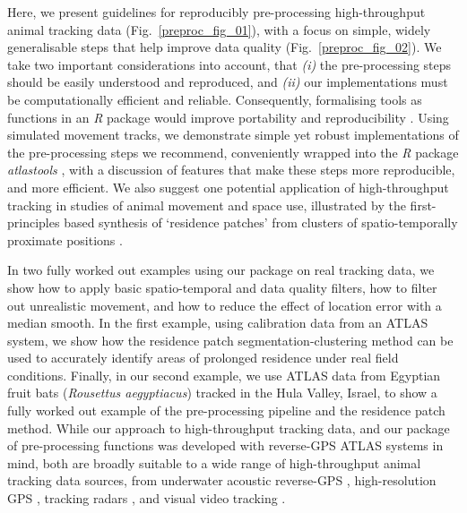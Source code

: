     Here, we present guidelines for reproducibly pre-processing high-throughput animal tracking data (Fig.~\ref{preproc_fig_01}), with a focus on simple, widely generalisable steps that help improve data quality (Fig.~\ref{preproc_fig_02}).
    We take two important considerations into account, that \textit{(i)} the pre-processing steps should be easily understood and reproduced, and \textit{(ii)} our implementations must be computationally efficient and reliable.
    Consequently, formalising tools as functions in an \textit{R} package would improve portability and reproducibility \citep{marwick2018, wickham2015}.
    Using simulated movement tracks, we demonstrate simple yet robust implementations of the pre-processing steps we recommend, conveniently wrapped into the \textit{R} package \textit{atlastools} \citep{gupte2020a}, with a discussion of features that make these steps more reproducible, and more efficient.
    We also suggest one potential application of high-throughput tracking in studies of animal movement and space use, illustrated by the first-principles based synthesis of `residence patches' from clusters of spatio-temporally proximate positions \citep[\textit{sensu}][]{bijleveld2016, oudman2018, barraquand2008}.

    In two fully worked out examples using our package on real tracking data, we show how to apply basic spatio-temporal and data quality filters, how to filter out unrealistic movement, and how to reduce the effect of location error with a median smooth.
    In the first example, using calibration data from an ATLAS system, we show how the residence patch segmentation-clustering method can be used to accurately identify areas of prolonged residence under real field conditions.
    Finally, in our second example, we use ATLAS data from Egyptian fruit bats (\textit{Rousettus aegyptiacus}) tracked in the Hula Valley, Israel, to show a fully worked out example of the pre-processing pipeline and the residence patch method.
    While our approach to high-throughput tracking data, and our package of pre-processing functions was developed with reverse-GPS ATLAS systems in mind, both are broadly suitable to a wide range of high-throughput animal tracking data sources, from underwater acoustic reverse-GPS \citep{baktoft2019, baktoft2017, jung2015, aspillaga2021, aspillaga2021a}, high-resolution GPS \citep{strandburg-peshkin2015, papageorgiou2019, harel2016, klarevas-irby2021}, tracking radars \citep{horvitz2014}, and visual video tracking \citep{rathore2020, perez-escudero2014}.

